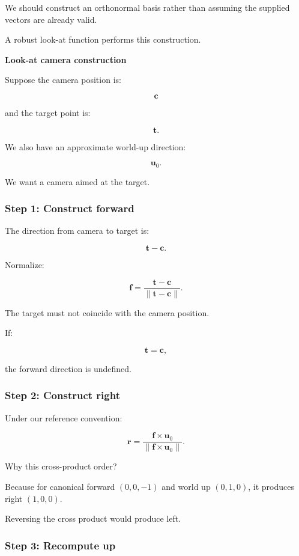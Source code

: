 We should construct an orthonormal basis rather than assuming the supplied vectors are already valid.

A robust look-at function performs this construction.

\textbf{Look-at camera construction}

Suppose the camera position is:

\[
 \mathbf c
\]

and the target point is:

\[
 \mathbf t.
\]

We also have an approximate world-up direction:

\[
 \mathbf u_0.
\]

We want a camera aimed at the target.

\subsubsection{Step 1: Construct forward}\label{step-1-construct-forward}

The direction from camera to target is:

\[
 \mathbf t-\mathbf c.
\]

Normalize:

\[
 \boxed{ \mathbf f= \frac{\mathbf t-\mathbf c} {\|\mathbf t-\mathbf c\|} }.
\]

The target must not coincide with the camera position.

If:

\[
 \mathbf t=\mathbf c,
\]

the forward direction is undefined.

\subsubsection{Step 2: Construct right}\label{step-2-construct-right}

Under our reference convention:

\[
 \boxed{ \mathbf r= \frac{\mathbf f\times\mathbf u_0} {\|\mathbf f\times\mathbf u_0\|} }.
\]

Why this cross-product order?

Because for canonical forward \((0,0,-1)\) and world up \((0,1,0)\), it produces right \((1,0,0)\).

Reversing the cross product would produce left.

\subsubsection{Step 3: Recompute up}\label{step-3-recompute-up}

